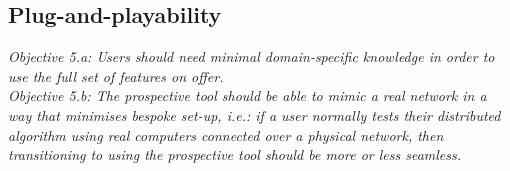 \subsection{Plug-and-playability}\label{subsection:plug_and_playability}

\emph{Objective 5.a: Users should need minimal domain-specific knowledge in order to use the full set of features on
offer.} \\
\emph{Objective 5.b: The prospective tool should be able to mimic a real network in a way that minimises bespoke set-up,
    i.e.: if a user normally tests their distributed algorithm using real computers connected over a physical
    network, then transitioning to using the prospective tool should be more or less seamless.}
